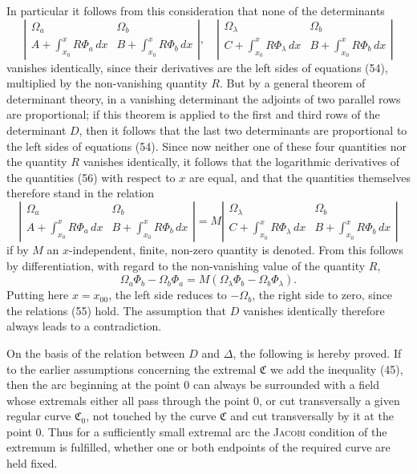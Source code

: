 \documentclass[11pt,a4paper,leqno]{article}
\begin{document}
In particular it follows from this consideration that none of the determinants
\begin{equation}\tag{56}
\left|\begin{array}{cc}
\Omega_a&\Omega_b\\[.8ex]
A+\displaystyle\int_{x_0}^{x}R\Phi_a\,dx&B+\displaystyle\int_{x_0}^{x}R\Phi_b\,dx
\end{array}\right|,
\quad
\left|\begin{array}{cc}
\Omega_\lambda&\Omega_b\\[.8ex]
C+\displaystyle\int_{x_0}^{x}R\Phi_\lambda\,dx&B+\displaystyle\int_{x_0}^{x}R\Phi_b\,dx
\end{array}\right|
\end{equation}
vanishes identically, since their derivatives are the left sides of equations (54), multiplied by the non-vanishing quantity $R$. But by a general theorem of determinant theory, in a vanishing determinant the adjoints of two parallel rows are proportional; if this theorem is applied to the first and third rows of the determinant $D$, then it follows that the last two determinants are proportional to the left sides of equations (54). Since now neither one of these four quantities nor the quantity $R$ vanishes identically, it follows that the logarithmic derivatives of the quantities (56) with respect to $x$ are equal, and that the quantities themselves therefore stand in the relation
\[
\left|\begin{array}{cc}
\Omega_a&\Omega_b\\[.8ex]
A+\displaystyle\int_{x_0}^{x}R\Phi_a\,dx&B+\displaystyle\int_{x_0}^{x}R\Phi_b\,dx
\end{array}\right|
=M
\left|\begin{array}{cc}
\Omega_\lambda&\Omega_b\\[.8ex]
C+\displaystyle\int_{x_0}^{x}R\Phi_\lambda\,dx&B+\displaystyle\int_{x_0}^{x}R\Phi_b\,dx
\end{array}\right|
\]
if by $M$ an $x$-independent, finite, non-zero quantity is denoted. From this follows by differentiation, with regard to the non-vanishing value of the quantity $R$,
\[
\Omega_a\Phi_b-\Omega_b\Phi_a=M(\Omega_\lambda\Phi_b-\Omega_b\Phi_\lambda).
\]
Putting here $x=x_{00}$, the left side reduces to $-\Omega_b$, the right side to zero, since the relations (55) hold. The assumption that $D$ vanishes identically therefore always leads to a contradiction.

On the basis of the relation between $D$ and $\Delta$, the following is hereby proved. If to the earlier assumptions concerning the extremal $\mathfrak{C}$ we add the inequality (45), then the arc beginning at the point 0 can always be surrounded with a field whose extremals either all pass through the point 0, or cut transversally a given regular curve $\mathfrak{C}_0$, not touched by the curve $\mathfrak{C}$ and cut transversally by it at the point 0. Thus for a sufficiently small extremal arc the \textsc{Jacobi} condition of the extremum is fulfilled, whether one or both endpoints of the required curve are held fixed.
\end{document}
